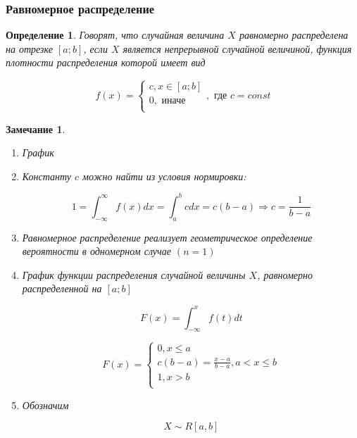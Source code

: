 \documentclass[a4paper, 14pt]{report}
\newtheorem{defenition}{Определение}[section]
\newtheorem{note}{Замечание}[section]
\begin{document}
\subsubsection{Равномерное распределение}

\begin{defenition}
    Говорят, что случайная величина $X$ равномерно распределена на отрезке $[a;b]$, если $X$ является непрерывной случайной величиной, функция плотности распределения которой имеет вид

    $$
    f(x) =
    \begin{cases}
        c, x \in [a;b] \\
        0, \text{ иначе} \\
    \end{cases}, \text{ где } c = const
    $$
\end{defenition}

\begin{note}
    \begin{enumerate}
        \item График
        \item Константу $c$ можно найти из условия нормировки:

            $$
            1 = \int_{-\infty}^\infty f(x) dx = \int_a^b c dx = c(b-a) \Rightarrow c = \frac{1}{b-a}
            $$

        \item Равномерное распределение реализует геометрическое определение вероятности в одномерном случае $(n=1)$

        \item График функции распределения случайной величины $X$, равномерно распределенной на $[a;b]$

            $$
            F(x) = \int_{-\infty}^x f(t)dt
            $$

            $$
            F(x) =
            \begin{cases}
                0, x \le a \\
                c(b-a) = \frac{x-a}{b-a}, a < x \le b \\
                1, x > b \\
            \end{cases}
            $$

        \item Обозначим

            $$
            X \sim R[a,b]
            $$
    \end{enumerate}
\end{note}
\end{document}
